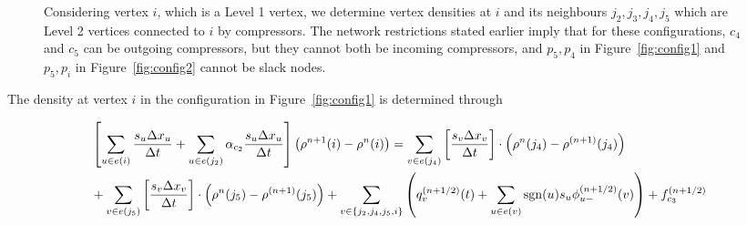\documentclass{amsart}
\DeclareMathOperator{\sgn}{sgn}
\begin{document}
\begin{figure}[htb]
\caption{Considering vertex $i$, which is a Level 1 vertex, we determine vertex densities at $i$ and its neighbours $j_2, j_3, j_4, j_5$  which are Level 2 vertices connected to $i$ by compressors. The network restrictions stated earlier imply that for these configurations, $c_4$ and $c_5$ can be outgoing compressors, but they cannot both be incoming compressors, and $p_5, p_4$ in Figure~\ref{fig:config1} and $p_5, p_i$ in
Figure~\ref{fig:config2} cannot be slack nodes.}
\label{fig:configs}
\end{figure}



The density at vertex $i$ in the configuration in Figure~\ref{fig:config1} is determined through

\begin{align}
& \left[ \sum_{u \in e(i)}\frac{s_{u} \Delta x_{u}}{\Delta t} + \sum_{u \in e(j_2)}\alpha_{c_2}\frac{s_{u} \Delta x_{u}}{\Delta t} \right] \left( \rho^{n+1}(i) - \rho^n(i) \right) =  \sum_{v \in e(j_4)}\left[\frac{s_{v} \Delta x_{v}}{\Delta t}\right] \cdot \left(\rho^{n}(j_4) - \rho^{(n+1)}(j_4) \right) \notag \\
& + \sum_{v \in e(j_5)}\left[\frac{s_{v} \Delta x_{v}}{\Delta t}\right] \cdot \left(\rho^{n}(j_5) - \rho^{(n+1)}(j_5) \right) 
+\sum_{v \in \{j_2, j_4, j_5, i\}} \left( q^{(n+1/2)}_{v}(t) + \sum_{u \in e(v)}\sgn(u) s_{u} \phi_{u-}^{(n+1/2)}(v) \right) + f^{(n+1/2)}_{c_3}
\label{eqn:config1}
\end{align}
\end{document}
